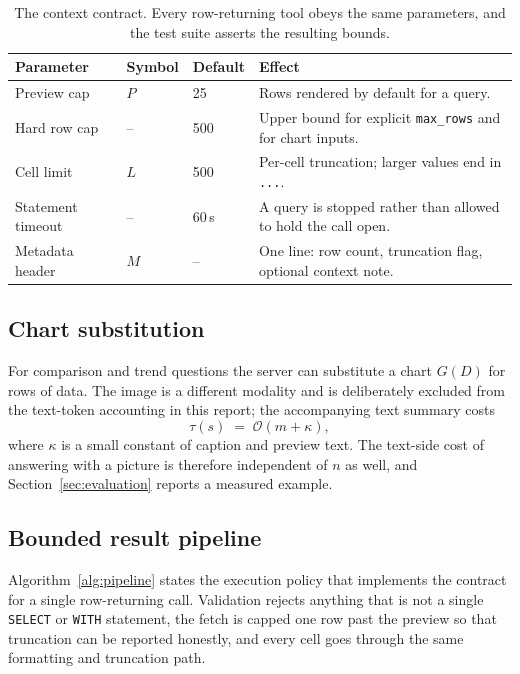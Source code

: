 \begin{table}[t]
\centering
\small
\begin{tabularx}{\textwidth}{l l l L}
\toprule
Parameter & Symbol & Default & Effect \\
\midrule
Preview cap & $P$ & 25 & Rows rendered by default for a query. \\
Hard row cap & -- & 500 & Upper bound for explicit \texttt{max\_rows} and for chart inputs. \\
Cell limit & $L$ & 500 & Per-cell truncation; larger values end in \texttt{...}. \\
Statement timeout & -- & 60\,s & A query is stopped rather than allowed to hold the call open. \\
Metadata header & $M$ & -- & One line: row count, truncation flag, optional context note. \\
\bottomrule
\end{tabularx}
\caption{The context contract. Every row-returning tool obeys the same parameters, and the test suite asserts the resulting bounds.}
\label{tab:contract}
\end{table}

\subsection{Chart substitution}

For comparison and trend questions the server can substitute a chart $G(D)$ for rows of data. The image is a different modality and is deliberately excluded from the text-token accounting in this report; the accompanying text summary costs
\begin{equation}
\tau(s) \;=\; \mathcal{O}(m + \kappa),
\label{eq:chart}
\end{equation}
where $\kappa$ is a small constant of caption and preview text. The text-side cost of answering with a picture is therefore independent of $n$ as well, and Section~\ref{sec:evaluation} reports a measured example.

\subsection{Bounded result pipeline}

Algorithm~\ref{alg:pipeline} states the execution policy that implements the contract for a single row-returning call. Validation rejects anything that is not a single \texttt{SELECT} or \texttt{WITH} statement, the fetch is capped one row past the preview so that truncation can be reported honestly, and every cell goes through the same formatting and truncation path.

